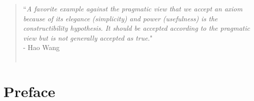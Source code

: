 \vspace*{0pt}

\begin{adjustwidth}{7cm}{0cm}
\begin{quote}
``\textit{A favorite example against the pragmatic view that we accept an axiom because of its elegance (simplicity) and power (usefulness) is the constructibility hypothesis. It should be accepted according to the pragmatic view but is not generally accepted as true.}"\\

 - Hao Wang \citep{Wang}\\\\
\end{quote}
\end{adjustwidth}

\section*{\huge Preface}
\thispagestyle{fancy}
\setlength{\parindent}{18pt}

